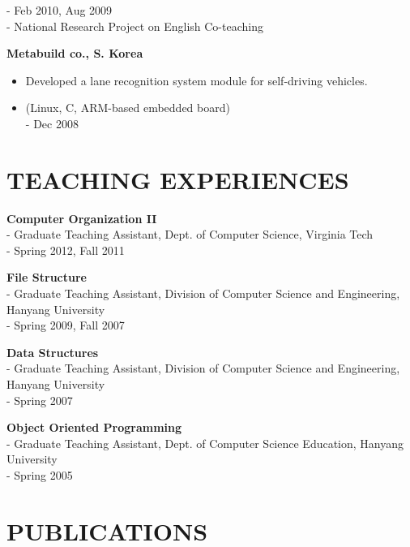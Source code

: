 \documentclass{res}
\begin{document}
\begin{resume}
\begin{itemize}
      - {\small Feb 2010, Aug 2009}\\
      - {\small National Research Project on English Co-teaching}
      \end{itemize}
   {\bf Metabuild co., S. Korea}
      \begin{itemize}
      \item[] Developed a lane recognition system module for self-driving
	      vehicles.
      \item[] (Linux, C, ARM-based embedded board)
      \vspace{0.05in}\\
      - {\small Dec 2008}\\
      \end{itemize}
 
 
\section{TEACHING EXPERIENCES} 
\vspace{0.1in} 
   {\bf Computer Organization II}
      \vspace{0.02in}\\
      - {\small Graduate Teaching Assistant, Dept. of Computer Science, Virginia
      Tech}\\
      - {\small Spring 2012, Fall 2011}

   {\bf File Structure}
      \vspace{0.02in}\\
      - {\small Graduate Teaching Assistant, Division of Computer Science and
      Engineering, Hanyang University}\\
      - {\small Spring 2009, Fall 2007}

   {\bf Data Structures}
      \vspace{0.02in}\\
      - {\small Graduate Teaching Assistant, Division of Computer Science and
      Engineering, Hanyang University}\\
      - {\small Spring 2007}

   {\bf Object Oriented Programming}
      \vspace{0.02in}\\
      - {\small Graduate Teaching Assistant, Dept. of Computer Science
      Education, Hanyang University}\\
      - {\small Spring 2005}

\section{PUBLICATIONS} 
\vspace{0.1in}


\end{resume}
\end{document}
